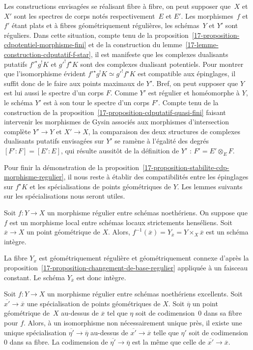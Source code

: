 \documentclass[10pt]{../fichiers-configuration-latex/smfart}
\begin{document}
Les constructions envisagées se réalisant fibre à fibre, on peut supposer
que $X$ et $X'$ sont les spectres de corps notés
respectivement $E$ et $E'$. Les morphismes $f$ et $f'$ étant plats et à
fibres géométriquement régulières, les schémas $Y$ et $Y'$ sont réguliers.
Dans cette situation, compte tenu de la 
proposition~\ref{17-proposition-cdpotentiel-morphisme-fini} et de 
la construction du lemme~\ref{17-lemme-construction-cdputatif-f-star},
il est manifeste que les complexes dualisants putatifs 
${f'}^\star g^! K$ et ${g'}^!f^\star K$ sont des complexes dualisant
potentiels. Pour montrer que l'isomorphisme évident 
${f'}^\star g^! K\simeq {g'}^!f^\star K$ est compatible aux épinglages, il
suffit donc de le faire aux points maximaux de $Y'$.
Bref, on peut supposer que
$Y$ est lui aussi le spectre d'un corps $F$. Comme $Y'$ est régulier et
homéomorphe à $Y$, le schéma $Y'$ est à son tour
le spectre d'un corps $F'$. Compte tenu
de la construction de la proposition~\ref{17-proposition-cdputatif-quasi-fini}
faisant intervenir les morphismes de Gysin associés aux morphismes
d'intersection complète $Y'\to Y$ et $X'\to X$,
la comparaison des deux structures de complexes dualisants putatifs
envisagées sur $Y'$ se ramène à l'égalité des degrés $[F':F]=[E':E]$,
qui résulte aussitôt de la définition de $Y'$ : $F'=E'\otimes_E F$.

\bigskip

Pour finir la démonstration de la
proposition~\ref{17-proposition-stabilite-cdp-morphisme-regulier}, il nous
reste à établir des compatibilités entre les épinglages sur $f^\star K$ et
les spécialisations de points géométriques de $Y$. Les lemmes suivants sur
les spécialisations nous seront utiles.

\begin{lemme3}\label{17-lemme-morphismes-reguliers-connexite}
Soit $f\colon Y\to X$ un morphisme régulier entre
schémas noethériens. On suppose que $f$ est un
morphisme local entre schémas locaux strictements henséliens. Soit
$\overline x\to X$ un point géométrique de $X$. Alors, $f^{-1}(\overline
x)=Y_{\overline x}=Y\times_X\overline x$ est un schéma intègre.
\end{lemme3}

La fibre $Y_x$ est géométriquement régulière et géométriquement connexe
d'après la proposition~\ref{17-proposition-changement-de-base-regulier}
appliquée à un faisceau constant. Le schéma $Y_{\overline x}$ est donc
intègre.

\begin{lemme3}\label{17-lemme-morphismes-reguliers-specialisations-generiques}
Soit $f\colon Y\to X$ un morphisme régulier
entre schémas noethériens excellents. Soit $\overline
{x'}\to\overline x$ une spécialisation de points géométriques de $X$. Soit
$\overline{\eta}$ un point géométrique de $X$ au-dessus de $\overline x$
tel que $\eta$ soit de codimension $0$ dans sa fibre pour $f$. Alors, à un
isomorphisme non nécessairement unique près, il existe une unique
spécialisation $\overline{\eta'}\to\overline\eta$ au-dessus de
$\overline{x'}\to\overline{x}$ telle que $\eta'$ soit de codimension $0$
dans sa fibre. La codimension de $\overline{\eta'}\to\overline\eta$
est la même que celle de $\overline {x'}\to\overline x$.
\end{lemme3}
\end{document}
